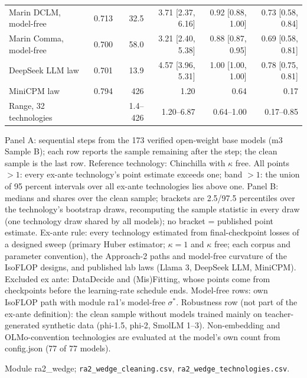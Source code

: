 \begin{table}[tp]
{\begin{tabular}{@{}lrrrrrrr@{}}
Marin DCLM, model-free & 0.713 & 32.5 & \multicolumn{2}{r}{3.71 {\scriptsize[2.37, 6.16]}} & \multicolumn{2}{r}{0.92 {\scriptsize[0.88, 1.00]}} & 0.73 {\scriptsize[0.58, 0.84]} \\
Marin Comma, model-free & 0.700 & 58.0 & \multicolumn{2}{r}{3.21 {\scriptsize[2.40, 5.38]}} & \multicolumn{2}{r}{0.88 {\scriptsize[0.87, 0.95]}} & 0.69 {\scriptsize[0.58, 0.81]} \\
DeepSeek LLM law & 0.701 & 13.9 & \multicolumn{2}{r}{4.57 {\scriptsize[3.96, 5.31]}} & \multicolumn{2}{r}{1.00 {\scriptsize[1.00, 1.00]}} & 0.78 {\scriptsize[0.75, 0.81]} \\
MiniCPM law & 0.794 & 426 & \multicolumn{2}{r}{1.20} & \multicolumn{2}{r}{0.64} & 0.17 \\
\midrule
Range, 32 technologies & & 1.4--426 & \multicolumn{2}{r}{1.20--6.87} & \multicolumn{2}{r}{0.64--1.00} & 0.17--0.85 \\
\bottomrule
\end{tabular}%
}
\ifdim\wd\ratabbox>\textwidth\resizebox{\textwidth}{!}{\usebox{\ratabbox}}\else\usebox{\ratabbox}\fi\par
\begin{tablenotes}Panel A: sequential steps from the 173 verified open-weight base models (m3 Sample B); each row reports the sample remaining after the step; the clean sample is the last row. Reference technology: Chinchilla with $\kappa$ free. All points $>1$: every ex-ante technology's point estimate exceeds one; band $>1$: the union of 95 percent intervals over all ex-ante technologies lies above one. Panel B: medians and shares over the clean sample; brackets are 2.5/97.5 percentiles over the technology's bootstrap draws, recomputing the sample statistic in every draw (one technology draw shared by all models); no bracket = published point estimate. Ex-ante rule: every technology estimated from final-checkpoint losses of a designed sweep (primary Huber estimator; $\kappa=1$ and $\kappa$ free; each corpus and parameter convention), the Approach-2 paths and model-free curvature of the IsoFLOP designs, and published lab laws (Llama 3, DeepSeek LLM, MiniCPM). Excluded ex ante: DataDecide and (Mis)Fitting, whose points come from checkpoints before the learning-rate schedule ends. Model-free rows: own IsoFLOP path with module ra1's model-free $\sigma^*$. Robustness row (not part of the ex-ante definition): the clean sample without models trained mainly on teacher-generated synthetic data (phi-1.5, phi-2, SmolLM 1--3). Non-embedding and OLMo-convention technologies are evaluated at the model's own count from config.json (77 of 77 models).\end{tablenotes}
\begin{tablenotes}[Source]Module ra2\_wedge; \texttt{ra2\_wedge\_cleaning.csv}, \texttt{ra2\_wedge\_technologies.csv}.\end{tablenotes}
\end{table}
